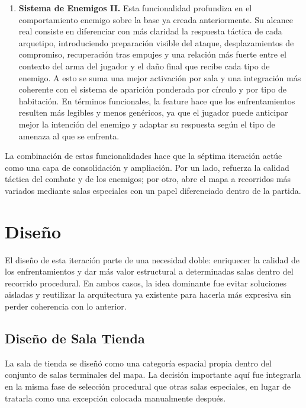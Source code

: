 \begin{enumerate}
En la práctica, esta ampliación hace que el combate se perciba como un sistema más expresivo,
con mejor retroalimentación y con una conexión más sólida entre entrada, ataque, obtención de
alma y efecto producido en pantalla.

\item \textbf{Sistema de Enemigos II.} Esta funcionalidad profundiza en el comportamiento
enemigo sobre la base ya creada anteriormente. Su alcance real consiste en diferenciar con
más claridad la respuesta táctica de cada arquetipo, introduciendo preparación visible del
ataque, desplazamientos de compromiso, recuperación tras empujes y una relación más fuerte
entre el contexto del arma del jugador y el daño final que recibe cada tipo de enemigo. A
esto se suma una mejor activación por sala y una integración más coherente con el sistema de
aparición ponderada por círculo y por tipo de habitación. En términos funcionales, la
feature hace que los enfrentamientos resulten más legibles y menos genéricos, ya que el
jugador puede anticipar mejor la intención del enemigo y adaptar su respuesta según el tipo
de amenaza al que se enfrenta.

\end{enumerate}

La combinación de estas funcionalidades hace que la séptima iteración actúe como una capa de
consolidación y ampliación. Por un lado, refuerza la calidad táctica del combate y de los
enemigos; por otro, abre el mapa a recorridos más variados mediante salas especiales con un
papel diferenciado dentro de la partida.

\section{Diseño}
El diseño de esta iteración parte de una necesidad doble: enriquecer la calidad de los
enfrentamientos y dar más valor estructural a determinadas salas dentro del recorrido
procedural. En ambos casos, la idea dominante fue evitar soluciones aisladas y reutilizar la
arquitectura ya existente para hacerla más expresiva sin perder coherencia con lo anterior.

\subsection{Diseño de Sala Tienda}
La sala de tienda se diseñó como una categoría espacial propia dentro del conjunto de salas
terminales del mapa. La decisión importante aquí fue integrarla en la misma fase de
selección procedural que otras salas especiales, en lugar de tratarla como una excepción
colocada manualmente después.

